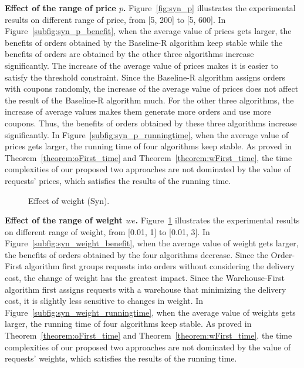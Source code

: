 \textbf{Effect of the range of price $p$.} Figure~\ref{fig:syn_p} illustrates the experimental results on different range of price, from [5, 200] to [5, 600]. In Figure~\ref{subfig:syn_p_benefit}, when the average value of prices gets larger, the benefits of orders obtained by the Baseline-R algorithm keep stable while the benefits of orders are obtained by the other three algorithms increase significantly. The increase of the average value of prices makes it is easier to satisfy the threshold constraint. Since the Baseline-R algorithm assigns orders with coupons randomly, the increase of the average value of prices does not affect the result of the Baseline-R algorithm much. For the other three algorithms, the increase of average values makes them generate more orders and use more coupons. Thus, the benefits of orders obtained by these three algorithms increase significantly. In Figure~\ref{subfig:syn_p_runningtime}, when the average value of prices gets larger, the running time of four algorithms keep stable. As proved in Theorem~\ref{theorem:oFirst_time} and Theorem~\ref{theorem:wFirst_time}, the time complexities of our proposed two approaches are not dominated by the value of requests' prices, which satisfies the results of the running time.

\begin{figure}[t!]\centering
	\subfigcapskip=-5pt
	\vspace{-2ex}
	\addtocounter{subfigure}{-1}
	\figureCaptionMargin
	\caption{\small Effect of weight (Syn).}\figureBelowMargin
	\label{fig:syn_we}
\end{figure}

\textbf{Effect of the range of weight $we$.} Figure~\ref{fig:syn_we} illustrates the experimental results on different range of weight, from [0.01, 1] to [0.01, 3]. In Figure~\ref{subfig:syn_weight_benefit}, when the average value of weight gets larger, the benefits of orders obtained by the four algorithms decrease. Since the Order-First algorithm first groups requests into orders without considering the delivery cost, the change of weight has the greatest impact. Since the Warehouse-First algorithm first assigns requests with a warehouse that minimizing the delivery cost, it is slightly less sensitive to changes in weight. In Figure~\ref{subfig:syn_weight_runningtime}, when the average value of weights gets larger, the running time of four algorithms keep stable. As proved in Theorem~\ref{theorem:oFirst_time} and Theorem~\ref{theorem:wFirst_time}, the time complexities of our proposed two approaches are not dominated by the value of requests' weights, which satisfies the results of the running time.


